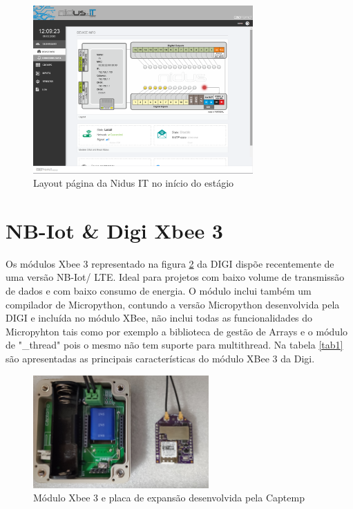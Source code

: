 \begin{figure}[ht]
\centering
\includegraphics[width=0.75\textwidth]{images/layoutPAginaInit.png}
\caption{Layout página da Nidus IT no início do estágio}\label{fignidusPage}
\end{figure}


\section {NB-Iot \& Digi Xbee 3 }\label{nbiot}
\par
Os módulos Xbee 3 representado na figura \ref{figxbee} da DIGI dispõe recentemente de uma versão NB-Iot/ LTE. Ideal para projetos com baixo volume de transmissão de dados e com baixo consumo de energia. O módulo inclui também um compilador de Micropython, contundo a versão Micropython desenvolvida pela DIGI e incluída no módulo XBee, não inclui todas as funcionalidades do Micropyhton tais como por exemplo a biblioteca de gestão de Arrays e o módulo de "\_thread" pois o mesmo não tem suporte para multithread.
Na tabela \ref{tab1} são apresentadas as principais características do módulo XBee 3 da Digi\cite{Digixbee}.

\begin{figure}[ht]
\centering
\includegraphics[width=0.60\textwidth]{images/xbee.jpg}
\caption{Módulo Xbee 3 e placa de expansão desenvolvida pela Captemp}\label{figxbee}
\end{figure}

